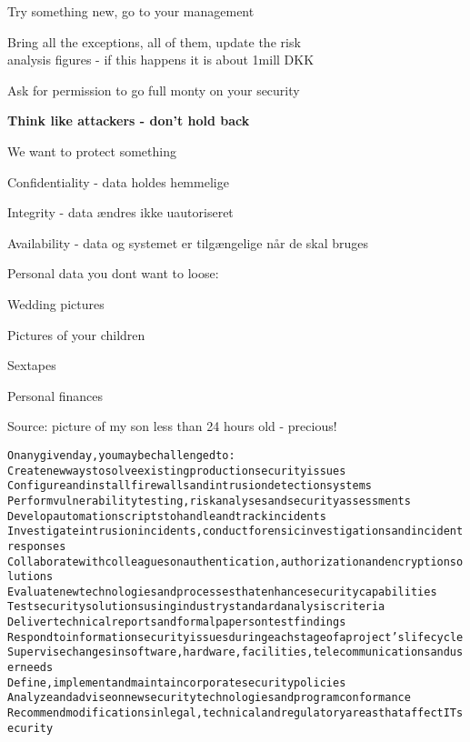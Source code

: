 \documentclass[Screen16to9,17pt]{foils}
\begin{document}
Try something new, go to your management

Bring all the exceptions, all of them, update the risk \\
analysis figures - if this happens it is about 1mill DKK

Ask for permission to go full monty on your security

{\bf Think like attackers - don't hold back}




\begin{list1}
\item We want to protect something
\item Confidentiality - data holdes hemmelige
\item Integrity - data ændres ikke uautoriseret
\item Availability - data og systemet er tilgængelige når de skal bruges
\end{list1}


\begin{list1}
\item Personal data you dont want to loose:
\begin{list2}
\item Wedding pictures
\item Pictures of your children
\item Sextapes
\item Personal finances
\end{list2}
\end{list1}

Source: picture of my son less than 24 hours old - precious!




\begin{alltt}\small
On any given day, you may be challenged to:
        Create new ways to solve existing production security issues
        Configure and install firewalls and intrusion detection systems
        Perform vulnerability testing, risk analyses and security assessments
        Develop automation scripts to handle and track incidents
        Investigate intrusion incidents, conduct forensic investigations and incident responses
        Collaborate with colleagues on authentication, authorization and encryption solutions
        Evaluate new technologies and processes that enhance security capabilities
        Test security solutions using industry standard analysis criteria
        Deliver technical reports and formal papers on test findings
        Respond to information security issues during each stage of a project’s lifecycle
        Supervise changes in software, hardware, facilities, telecommunications and user needs
        Define, implement and maintain corporate security policies
        Analyze and advise on new security technologies and program conformance
        Recommend modifications in legal, technical and regulatory areas that affect IT security
\end{alltt}
\end{document}
